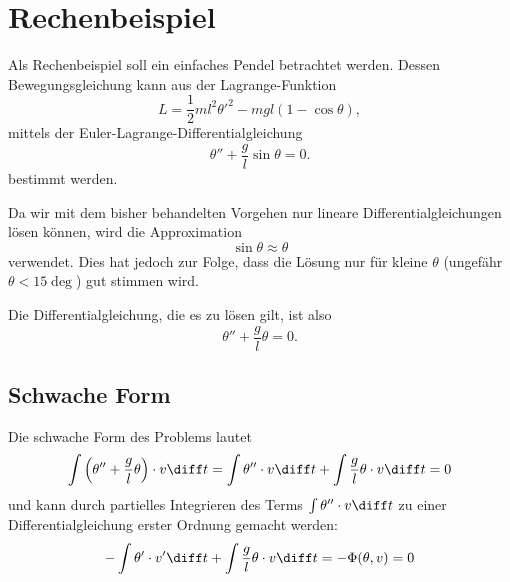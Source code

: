 %
%
%
%
\section{Rechenbeispiel\label{fem:rechenbsp}}

Als Rechenbeispiel soll ein einfaches Pendel betrachtet werden. 
Dessen Bewegungsgleichung kann aus der Lagrange-Funktion
\begin{equation}
    L = \frac{1}{2} m l^2 {\theta'}^2 - m g l (1 - \cos \theta),
\end{equation}
mittels der Euler-Lagrange-Differentialgleichung
\begin{equation}
    \theta'' + \frac{g}{l} \sin \theta = 0.
\end{equation}
bestimmt werden.

Da wir mit dem bisher behandelten Vorgehen nur lineare Differentialgleichungen lösen können, wird die Approximation
\begin{equation}
    \sin \theta \approx \theta
\end{equation}
verwendet. %
Dies hat jedoch zur Folge, dass die Lösung nur für kleine $\theta$ (ungefähr $\theta < 15 \deg$) gut stimmen wird.

Die Differentialgleichung, die es zu lösen gilt, ist also
\begin{equation}
    \theta'' + \frac{g}{l} \theta = 0.
\end{equation}


\subsection{Schwache Form}
Die schwache Form des Problems lautet
\begin{equation}
    \int \left( \theta'' + \frac{g}{l} \theta \right) \cdot v \diff t 
    = \int \theta'' \cdot v \diff t + \int \frac{g}{l} \theta \cdot v \diff t
    = 0
\end{equation}
und kann durch partielles Integrieren des Terms $\int \theta'' \cdot v \diff t$ zu einer Differentialgleichung erster Ordnung gemacht werden:
\begin{equation}
    - \int \theta' \cdot v' \diff t + \int \frac{g}{l} \theta \cdot v \diff t = -\Phi(\theta, v) = 0
    \label{fem:rechenbsp:schwache_form}
\end{equation}


